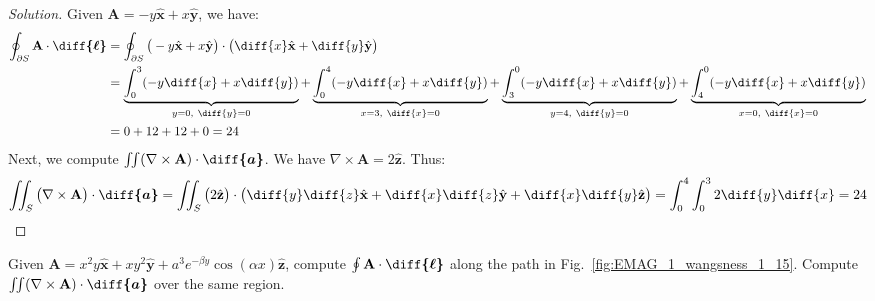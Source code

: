 \documentclass[crop=false,class=book,oneside]{standalone}
\begin{document}
            \begin{proof}[Solution]
                Given
                $\mathbf{A}=-y\hat{\mathbf{x}}+x\hat{\mathbf{y}}$,
                we have:
                \begin{align*}
                    \oint_{\partial S}
                    \mathbf{A}\cdot\boldsymbol{\diff{\ell}}
                    &=\oint_{\partial{S}}\big(-y\hat{\mathbf{x}}
                    +x\hat{\mathbf{y}}\big)
                    \cdot\big(\diff{x}\hat{\mathbf{x}}
                    +\diff{y}\hat{\mathbf{y}}\big)\\
                    &=\underbrace{%
                        \int_{0}^{3}(-y\diff{x}+x\diff{y})
                    }_{y=0,\ \diff{y}=0}
                    +\underbrace{%
                        \int_{0}^{4}(-y\diff{x}+x\diff{y})
                    }_{x=3,\ \diff{x}=0}
                    +\underbrace{%
                        \int_{3}^{0}(-y\diff{x}+x\diff{y})
                    }_{y=4,\ \diff{y}=0}
                    +\underbrace{%
                        \int_{4}^{0}(-y\diff{x}+x\diff{y})
                    }_{x=0,\ \diff{x}=0}\\
                    &=0+12+12+0=24
                \end{align*}
                Next, we compute
                $\iint(\nabla\times\mathbf{A})%
                 \cdot\boldsymbol{\diff{a}}$.
                We have
                $\nabla\times\mathbf{A}=%
                 2\hat{\mathbf{z}}$.
                Thus:
                \begin{equation*}
                    \iint_{S}\big(\nabla\times\mathbf{A}\big)
                    \cdot\boldsymbol{\diff{a}}
                    =\iint_{S}\big(2\hat{\mathbf{z}}\big)
                    \cdot\big(\diff{y}\diff{z}\hat{\mathbf{x}}
                    +\diff{x}\diff{z}\hat{\mathbf{y}}
                    +\diff{x}\diff{y}\hat{\mathbf{z}}\big)
                    =\int_{0}^{4}\int_{0}^{3}2\diff{y}\diff{x}
                    =24
                \end{equation*}
            \end{proof}
            \begin{problem}[Wangsness 1-15]
                \label{problem:EMAG_1_wangsness_1_15}
                Given
                $\mathbf{A}%
                 =x^{2}y\hat{\mathbf{x}}%
                 +xy^{2}\hat{\mathbf{y}}%
                 +a^{3}e^{-\beta{y}}\cos(\alpha{x})\hat{\mathbf{z}}$,
                compute
                $\oint\mathbf{A}\cdot\boldsymbol{\diff{\ell}}$
                along the path in Fig.~\ref{fig:EMAG_1_wangsness_1_15}.
                Compute
                $\iint(\nabla\times\mathbf{A})%
                 \cdot\boldsymbol{\diff{a}}$
                over the same region.
            \end{problem}
\end{document}
